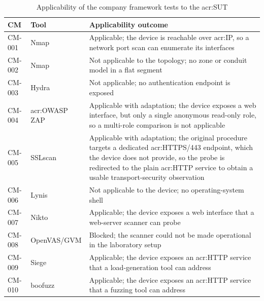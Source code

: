 \begin{table}[H] 
	\centering 
	\small 
	\caption{Applicability of the company framework tests to the \gls{acr:SUT}} 
	\label{tab:cm_applicability} 
	\begin{tabularx}{\textwidth}{l l X} \toprule \textbf{CM} & \textbf{Tool} & \textbf{Applicability outcome} \\ 
		\midrule 
		CM-001 & Nmap & Applicable; the device is reachable over \gls{acr:IP}, so a network port scan can enumerate its interfaces \\ 
		CM-002 & Nmap & Not applicable to the topology; no zone or conduit model in a flat segment \\ 
		CM-003 & Hydra & Not applicable; no authentication endpoint is exposed \\ 
		CM-004 & \gls{acr:OWASP} ZAP & Applicable with adaptation; the device exposes a web interface, but only a single anonymous read-only role, so a multi-role comparison is not applicable \\ 
		CM-005 & SSLscan & Applicable with adaptation; the original procedure targets a dedicated \gls{acr:HTTPS}/443 endpoint, which the device does not provide, so the probe is redirected to the plain \gls{acr:HTTP} service to obtain a usable transport-security observation \\ 
		CM-006 & Lynis & Not applicable to the device; no operating-system shell \\ 
		CM-007 & Nikto & Applicable; the device exposes a web interface that a web-server scanner can probe \\ 
		CM-008 & OpenVAS/GVM & Blocked; the scanner could not be made operational in the laboratory setup \\ 
		CM-009 & Siege & Applicable; the device exposes an \gls{acr:HTTP} service that a load-generation tool can address \\ 
		CM-010 & boofuzz & Applicable; the device exposes an \gls{acr:HTTP} service that a fuzzing tool can address \\ 
		\bottomrule 
	\end{tabularx} 
\end{table}



